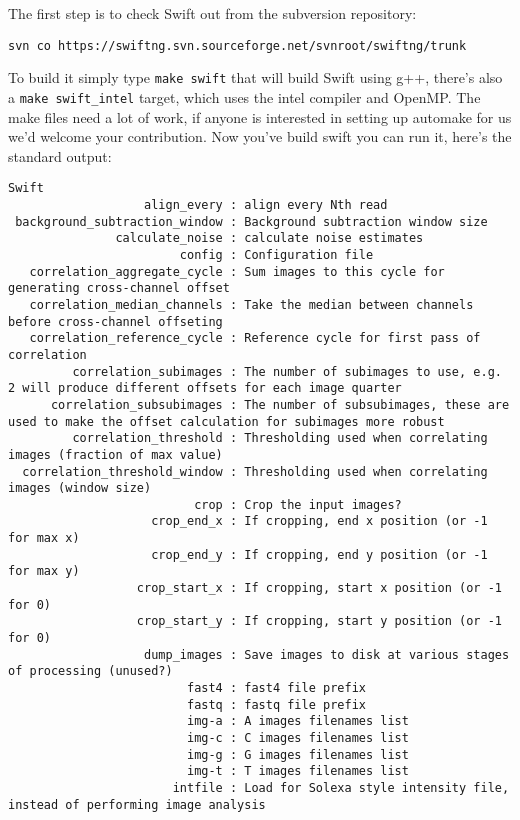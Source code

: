 \documentclass{report}
\begin{document}
The first step is to check Swift out from the subversion repository:

\begin{verbatim}
svn co https://swiftng.svn.sourceforge.net/svnroot/swiftng/trunk
\end{verbatim}

To build it simply type \texttt{make swift} that will build Swift using g++, there's also a \texttt{make swift\_intel} target, which uses the intel compiler and OpenMP. The make files need a lot of work, if anyone is interested in setting up automake for us we'd welcome your contribution. Now you've build swift you can run it, here's the standard output:

\begin{verbatim}
Swift
                   align_every : align every Nth read
 background_subtraction_window : Background subtraction window size
               calculate_noise : calculate noise estimates
                        config : Configuration file
   correlation_aggregate_cycle : Sum images to this cycle for generating cross-channel offset
   correlation_median_channels : Take the median between channels before cross-channel offseting
   correlation_reference_cycle : Reference cycle for first pass of correlation
         correlation_subimages : The number of subimages to use, e.g. 2 will produce different offsets for each image quarter
      correlation_subsubimages : The number of subsubimages, these are used to make the offset calculation for subimages more robust
         correlation_threshold : Thresholding used when correlating images (fraction of max value)
  correlation_threshold_window : Thresholding used when correlating images (window size)
                          crop : Crop the input images?
                    crop_end_x : If cropping, end x position (or -1 for max x)
                    crop_end_y : If cropping, end y position (or -1 for max y)
                  crop_start_x : If cropping, start x position (or -1 for 0)
                  crop_start_y : If cropping, start y position (or -1 for 0)
                   dump_images : Save images to disk at various stages of processing (unused?)
                         fast4 : fast4 file prefix
                         fastq : fastq file prefix
                         img-a : A images filenames list
                         img-c : C images filenames list
                         img-g : G images filenames list
                         img-t : T images filenames list
                       intfile : Load for Solexa style intensity file, instead of performing image analysis

\end{verbatim}
\end{document}
